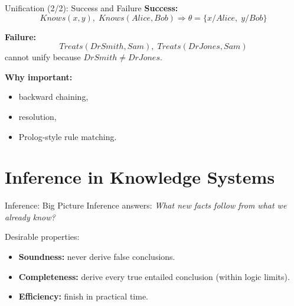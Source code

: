 \documentclass[10pt]{beamer}
\begin{document}
\begin{frame}{Unification (2/2): Success and Failure}
        \textbf{Success:}
        \[
            Knows(x,y),\; Knows(Alice,Bob)
            \Rightarrow \theta = \{x/Alice,\; y/Bob\}
        \]

        \vspace{0.1cm}
        \textbf{Failure:}
        \[
            Treats(DrSmith,Sam),\; Treats(DrJones,Sam)
        \]
        cannot unify because $DrSmith \neq DrJones$.

        \vspace{0.1cm}
        \textbf{Why important:}
        \begin{itemize}
                \item backward chaining,
                \item resolution,
                \item Prolog-style rule matching.
        \end{itemize}
\end{frame}

\section{Inference in Knowledge Systems}

\begin{frame}{Inference: Big Picture}
    Inference answers: \textit{What new facts follow from what we already know?}

    \vspace{0.2cm}
    Desirable properties:
    \begin{itemize}
        \item \textbf{Soundness:} never derive false conclusions.
        \item \textbf{Completeness:} derive every true entailed conclusion (within logic limits).
        \item \textbf{Efficiency:} finish in practical time.
    \end{itemize}
\end{frame}
\end{document}
